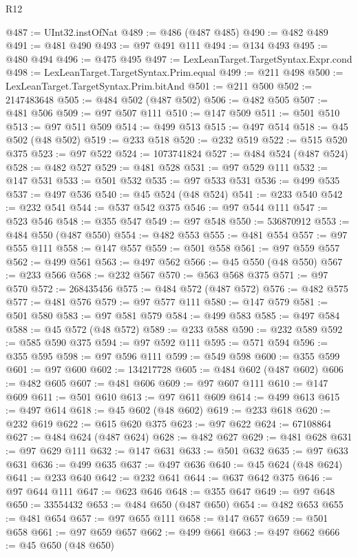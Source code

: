 \begin{lexlean}{R12}
\begin{coremodule}
@487 := UInt32.instOfNat
@489 := @486 (@487 @485)
@490 := @482 @489
@491 := @481 @490
@493 := @97 @491 @111
@494 := @134 @493
@495 := @480 @494
@496 := @475 @495
@497 := LexLeanTarget.TargetSyntax.Expr.cond
@498 := LexLeanTarget.TargetSyntax.Prim.equal
@499 := @211 @498
@500 := LexLeanTarget.TargetSyntax.Prim.bitAnd
@501 := @211 @500
@502 := 2147483648
@505 := @484 @502 (@487 @502)
@506 := @482 @505
@507 := @481 @506
@509 := @97 @507 @111
@510 := @147 @509
@511 := @501 @510
@513 := @97 @511 @509
@514 := @499 @513
@515 := @497 @514
@518 := @45 @502 (@48 @502)
@519 := @233 @518
@520 := @232 @519
@522 := @515 @520 @375
@523 := @97 @522
@524 := 1073741824
@527 := @484 @524 (@487 @524)
@528 := @482 @527
@529 := @481 @528
@531 := @97 @529 @111
@532 := @147 @531
@533 := @501 @532
@535 := @97 @533 @531
@536 := @499 @535
@537 := @497 @536
@540 := @45 @524 (@48 @524)
@541 := @233 @540
@542 := @232 @541
@544 := @537 @542 @375
@546 := @97 @544 @111
@547 := @523 @546
@548 := @355 @547
@549 := @97 @548
@550 := 536870912
@553 := @484 @550 (@487 @550)
@554 := @482 @553
@555 := @481 @554
@557 := @97 @555 @111
@558 := @147 @557
@559 := @501 @558
@561 := @97 @559 @557
@562 := @499 @561
@563 := @497 @562
@566 := @45 @550 (@48 @550)
@567 := @233 @566
@568 := @232 @567
@570 := @563 @568 @375
@571 := @97 @570
@572 := 268435456
@575 := @484 @572 (@487 @572)
@576 := @482 @575
@577 := @481 @576
@579 := @97 @577 @111
@580 := @147 @579
@581 := @501 @580
@583 := @97 @581 @579
@584 := @499 @583
@585 := @497 @584
@588 := @45 @572 (@48 @572)
@589 := @233 @588
@590 := @232 @589
@592 := @585 @590 @375
@594 := @97 @592 @111
@595 := @571 @594
@596 := @355 @595
@598 := @97 @596 @111
@599 := @549 @598
@600 := @355 @599
@601 := @97 @600
@602 := 134217728
@605 := @484 @602 (@487 @602)
@606 := @482 @605
@607 := @481 @606
@609 := @97 @607 @111
@610 := @147 @609
@611 := @501 @610
@613 := @97 @611 @609
@614 := @499 @613
@615 := @497 @614
@618 := @45 @602 (@48 @602)
@619 := @233 @618
@620 := @232 @619
@622 := @615 @620 @375
@623 := @97 @622
@624 := 67108864
@627 := @484 @624 (@487 @624)
@628 := @482 @627
@629 := @481 @628
@631 := @97 @629 @111
@632 := @147 @631
@633 := @501 @632
@635 := @97 @633 @631
@636 := @499 @635
@637 := @497 @636
@640 := @45 @624 (@48 @624)
@641 := @233 @640
@642 := @232 @641
@644 := @637 @642 @375
@646 := @97 @644 @111
@647 := @623 @646
@648 := @355 @647
@649 := @97 @648
@650 := 33554432
@653 := @484 @650 (@487 @650)
@654 := @482 @653
@655 := @481 @654
@657 := @97 @655 @111
@658 := @147 @657
@659 := @501 @658
@661 := @97 @659 @657
@662 := @499 @661
@663 := @497 @662
@666 := @45 @650 (@48 @650)

\end{coremodule}
\end{lexlean}
